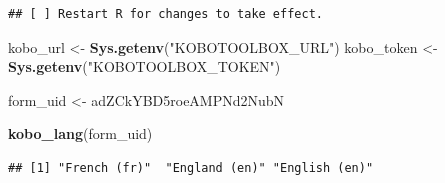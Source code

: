 \documentclass[
]{article}
\newenvironment{Shaded}{\begin{snugshade}}{\end{snugshade}}
\newcommand{\FunctionTok}[1]{\textcolor[rgb]{0.13,0.29,0.53}{\textbf{#1}}}
\newcommand{\NormalTok}[1]{#1}
\newcommand{\OtherTok}[1]{\textcolor[rgb]{0.56,0.35,0.01}{#1}}
\newcommand{\StringTok}[1]{\textcolor[rgb]{0.31,0.60,0.02}{#1}}
\begin{document}
\begin{verbatim}
## [ ] Restart R for changes to take effect.
\end{verbatim}

\begin{Shaded}
\begin{Highlighting}[]
\NormalTok{kobo\_url }\OtherTok{\textless{}{-}} \FunctionTok{Sys.getenv}\NormalTok{(}\StringTok{"KOBOTOOLBOX\_URL"}\NormalTok{)}
\NormalTok{kobo\_token }\OtherTok{\textless{}{-}} \FunctionTok{Sys.getenv}\NormalTok{(}\StringTok{"KOBOTOOLBOX\_TOKEN"}\NormalTok{)}

\NormalTok{form\_uid }\OtherTok{\textless{}{-}} \StringTok{\textquotesingle{}adZCkYBD5roeAMPNd2NubN\textquotesingle{}}

\FunctionTok{kobo\_lang}\NormalTok{(form\_uid)}
\end{Highlighting}
\end{Shaded}

\begin{verbatim}
## [1] "French (fr)"  "England (en)" "English (en)"
\end{verbatim}
\end{document}
